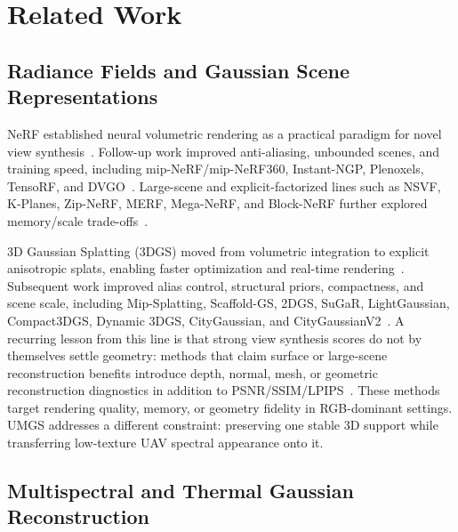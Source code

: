 ﻿\section{Related Work}

\subsection{Radiance Fields and Gaussian Scene Representations}

NeRF established neural volumetric rendering as a practical paradigm for novel view synthesis~\cite{mildenhall2020nerf,mildenhall2019llff}. Follow-up work improved anti-aliasing, unbounded scenes, and training speed, including mip-NeRF/mip-NeRF360, Instant-NGP, Plenoxels, TensoRF, and DVGO~\cite{barron2021mipnerf,barron2022mipnerf360,mueller2022instantngp,fridovich2022plenoxels,chen2022tensorf,sun2022dvgo}. Large-scene and explicit-factorized lines such as NSVF, K-Planes, Zip-NeRF, MERF, Mega-NeRF, and Block-NeRF further explored memory/scale trade-offs~\cite{liu2020nsvf,fridovich2023kplanes,barron2023zipnerf,reiser2023merf,turki2022meganerf,tancik2022blocknerf}.

3D Gaussian Splatting (3DGS) moved from volumetric integration to explicit anisotropic splats, enabling faster optimization and real-time rendering~\cite{kerbl2023gaussiansplatting}. Subsequent work improved alias control, structural priors, compactness, and scene scale, including Mip-Splatting, Scaffold-GS, 2DGS, SuGaR, LightGaussian, Compact3DGS, Dynamic 3DGS, CityGaussian, and CityGaussianV2~\cite{yu2024mipsplatting,lu2024scaffoldgs,huang20242dgs,guedon2024sugar,fan2024lightgaussian,lee2024compact3dgs,luiten2024dynamic3dgs,liu2024citygaussian,liu2024citygaussianv2}. A recurring lesson from this line is that strong view synthesis scores do not by themselves settle geometry: methods that claim surface or large-scene reconstruction benefits introduce depth, normal, mesh, or geometric reconstruction diagnostics in addition to PSNR/SSIM/LPIPS~\cite{huang20242dgs,guedon2024sugar,liu2024citygaussianv2}. These methods target rendering quality, memory, or geometry fidelity in RGB-dominant settings. UMGS addresses a different constraint: preserving one stable 3D support while transferring low-texture UAV spectral appearance onto it.

\subsection{Multispectral and Thermal Gaussian Reconstruction}

